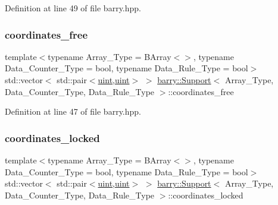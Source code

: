 Definition at line 49 of file barry.\+hpp.

\mbox{\label{classbarry_1_1_support_aa235837435a5ed7ac540481676333b88}} 
\subsubsection{\texorpdfstring{coordinates\+\_\+free}{coordinates\_free}}
{\footnotesize\ttfamily template$<$typename Array\+\_\+\+Type  = B\+Array$<$$>$, typename Data\+\_\+\+Counter\+\_\+\+Type  = bool, typename Data\+\_\+\+Rule\+\_\+\+Type  = bool$>$ \\
std\+::vector$<$ std\+::pair$<$\hyperlink{namespacebarry_a11dfc53ddb4672278319aa04f1e09a6c}{uint},\hyperlink{namespacebarry_a11dfc53ddb4672278319aa04f1e09a6c}{uint}$>$ $>$ \hyperlink{classbarry_1_1_support}{barry\+::\+Support}$<$ Array\+\_\+\+Type, Data\+\_\+\+Counter\+\_\+\+Type, Data\+\_\+\+Rule\+\_\+\+Type $>$\+::coordinates\+\_\+free}



Definition at line 47 of file barry.\+hpp.

\mbox{\label{classbarry_1_1_support_a3abcd564b19c7399b596a5b63c72b149}} 
\subsubsection{\texorpdfstring{coordinates\+\_\+locked}{coordinates\_locked}}
{\footnotesize\ttfamily template$<$typename Array\+\_\+\+Type  = B\+Array$<$$>$, typename Data\+\_\+\+Counter\+\_\+\+Type  = bool, typename Data\+\_\+\+Rule\+\_\+\+Type  = bool$>$ \\
std\+::vector$<$ std\+::pair$<$\hyperlink{namespacebarry_a11dfc53ddb4672278319aa04f1e09a6c}{uint},\hyperlink{namespacebarry_a11dfc53ddb4672278319aa04f1e09a6c}{uint}$>$ $>$ \hyperlink{classbarry_1_1_support}{barry\+::\+Support}$<$ Array\+\_\+\+Type, Data\+\_\+\+Counter\+\_\+\+Type, Data\+\_\+\+Rule\+\_\+\+Type $>$\+::coordinates\+\_\+locked}



